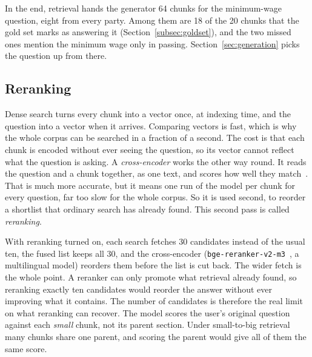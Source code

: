 In the end, retrieval hands the generator 64 chunks for the minimum-wage
question, eight from every party. Among them are 18 of the 20 chunks that the
gold set marks as answering it (Section~\ref{subsec:goldset}), and the two
missed ones mention the minimum wage only in passing. Section~\ref{sec:generation}
picks the question up from there.

\subsection{Reranking} \label{subsec:reranking}

Dense search turns every chunk into a vector once, at indexing time, and
the question into a vector when it arrives. Comparing vectors is fast, which
is why the whole corpus can be searched in a fraction of a second. The cost is
that each chunk is encoded without ever seeing the question, so its vector
cannot reflect what the question is asking. A \emph{cross-encoder} works the
other way round. It reads the question and a chunk together, as one text, and
scores how well they match~\citep{nogueira2019passagererankingbert}. That is
much more accurate, but it means one run of the model per chunk for every
question, far too slow for the whole corpus. So it is used second, to reorder
a shortlist that ordinary search has already found. This second pass is
called \emph{reranking}.

With reranking turned on, each search fetches 30 candidates instead of the
usual ten, the fused list keeps all 30, and the cross-encoder
(\texttt{bge-reranker-v2-m3}~\citep{bge-reranker-v2-m3}, a multilingual model)
reorders them before the list is cut back. The wider fetch is the whole point.
A reranker can only promote what retrieval already found, so reranking exactly
ten candidates would reorder the answer without ever improving what it
contains. The number of candidates is therefore the real limit on what
reranking can recover. The model scores the user's original question against
each \emph{small} chunk, not its parent section. Under small-to-big retrieval
many chunks share one parent, and scoring the parent would give all of them
the same score.

